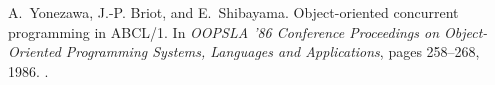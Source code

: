 \documentclass[10pt]{sigplanconf}
\begin{document}
\begin{thebibliography}{15}
A.~Yonezawa, J.-P. Briot, and E.~Shibayama.
\newblock Object-oriented concurrent programming in {ABCL/1}.
\newblock In \emph{OOPSLA '86 Conference Proceedings on Object-Oriented
  Programming Systems, Languages and Applications}, pages 258--268, 1986.
\newblock {}.

\end{thebibliography}
\end{document}
